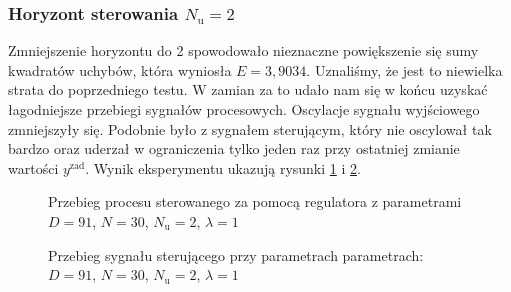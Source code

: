 \subsubsection{Horyzont sterowania $N_{\mathrm{u}} = 2$}
Zmniejszenie horyzontu do 2 spowodowało nieznaczne powiększenie się sumy kwadratów uchybów, która wyniosła $E = 3,9034$. Uznaliśmy, że jest to niewielka strata do poprzedniego testu. W zamian za to udało nam się w końcu uzyskać łagodniejsze przebiegi sygnałów procesowych. Oscylacje sygnału wyjściowego zmniejszyły się. Podobnie było z sygnałem sterującym, który nie oscylował tak bardzo oraz uderzał w ograniczenia tylko jeden raz przy ostatniej zmianie wartości $y^{\mathrm{zad}}$. Wynik eksperymentu ukazują rysunki \ref{dmc_Nu_2_y} i \ref{dmc_Nu_2_u}.
\\  
\begin{figure}[t]
    \centering
    \caption{Przebieg procesu sterowanego za pomocą regulatora z parametrami $D = 91$, $N = 30$, $N_{\mathrm{u}} = 2$, $\lambda = 1$}
    \label{dmc_Nu_2_y}
\end{figure}

\begin{figure}[b]
    \centering
    \caption{Przebieg sygnału sterującego przy parametrach parametrach: $D = 91$, $N = 30$, $N_{\mathrm{u}} = 2$, $\lambda = 1$}
    \label{dmc_Nu_2_u}
\end{figure}

